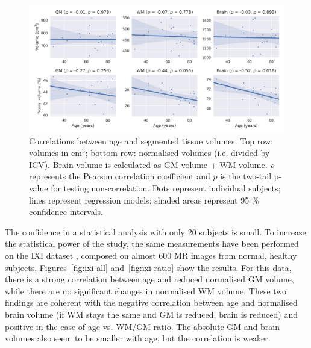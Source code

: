 \begin{figure}
  \centering
  \includegraphics[width=\textwidth]{figures/volumes_stats_pearson}
  \caption{Correlations between age and segmented tissue volumes. Top row: volumes in cm$^3$; bottom row: normalised volumes (i.e. divided by ICV). Brain volume is calculated as GM volume + WM volume. $\rho$ represents the Pearson correlation coefficient and $p$ is the two-tail p-value for testing non-correlation. Dots represent individual subjects; lines represent regression models; shaded areas represent 95 \% confidence intervals.}
  \label{fig:volumes-correlations}
\end{figure}

The confidence in a statistical analysis with only 20 subjects is small. To increase the statistical power of the study, the same measurements have been performed on the IXI dataset \cite{noauthor_ixi_nodate}, composed on almost 600 MR images from normal, healthy subjects. Figures~\ref{fig:ixi-all} and~\ref{fig:ixi-ratio} show the results. For this data, there is a strong correlation between age and reduced normalised GM volume, while there are no significant changes in normalised WM volume. These two findings are coherent with the negative correlation between age and normalised brain volume (if WM stays the same and GM is reduced, brain is reduced) and positive in the case of age vs. WM/GM ratio. The absolute GM and brain volumes also seem to be smaller with age, but the correlation is weaker.


